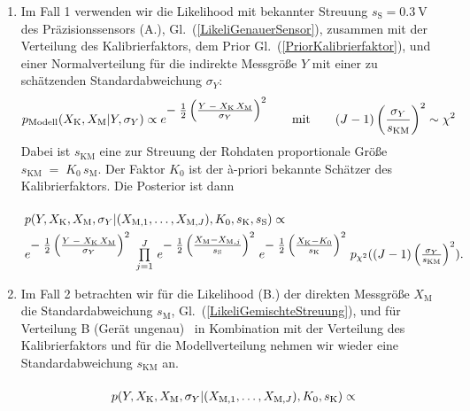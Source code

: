 \begin{enumerate}
	\item Im Fall 1 verwenden wir die Likelihood mit bekannter Streuung 
	$s_\mathrm{S} = 0.3~\mathrm{V}$ des Präzisions\-sensors (A.), Gl.~(\ref{LikeliGenauerSensor}),
	zusammen mit der Verteilung des Kalibrierfaktors, dem Prior Gl.~(\ref{PriorKalibrierfaktor}),
	und einer Normalverteilung für die indirekte Messgröße $Y$ mit einer zu
	schätzenden Standardabweichung $\sigma_Y$:
\begin{equation}
p_\mathrm{Modell} (X_\mathrm{K}, X_\mathrm{M} | Y, \sigma_Y) \propto
e^{\textstyle -\;\frac{1}{2} \left(\frac{ Y \; - \; X_\mathrm{K} \, X_\mathrm{M}}{\sigma_Y} \right)^2}
\qquad \mathrm{mit} \qquad
(J-1) \left(\frac{\sigma_Y}{s_\mathrm{KM}}\right)^2 \sim \chi^2
\label{pdfModellNormalverteilt}
\end{equation}
	Dabei ist $s_\mathrm{KM}$ eine zur Streuung der Rohdaten proportionale Größe
	$s_\mathrm{KM} \; = \; K_0 \, s_\mathrm{M}$. Der Faktor $K_0$ ist der {\`a}-priori
	bekannte Schätzer des Kalibrierfaktors.
	Die Posterior ist dann
\begin{equation}
\arraycolsep=2.0pt\def\arraystretch{2.0}
\begin{array}{l}
p(Y, X_\mathrm{K}, X_\mathrm{M}, \sigma_Y | (X_{\mathrm{M},1}, \dots, X_{\mathrm{M},J}), K_0, s_\mathrm{K}, s_\mathrm{S}) \propto \\
e^{\T-\;\frac{1}{2} \left(\frac{ Y \; - \; X_\mathrm{K} \, X_\mathrm{M}}{\sigma_Y} \right)^2}
\; \prod\limits_{j=1}^J \,
e^{\T -\;\frac{1}{2} \left(\frac{ X_\mathrm{M} - X_{\mathrm{M},j} }{s_\mathrm{S}} \right)^2}
\;  e^{\T-\;\frac{1}{2} \left(\frac{X_\mathrm{K} - K_0}{s_\mathrm{K}} \right)^2}
\; p_{\chi^2} ((J-1) \left(\frac{\sigma_Y}{s_\mathrm{KM}}\right)^2) .
\end{array}
\label{PosteriorFall1}
\end{equation}
	\item Im Fall 2 betrachten wir für die Likelihood (B.) der direkten Messgröße $X_\mathrm{M}$
	die Standardabweichung $s_\mathrm{M}$, Gl.~(\ref{LikeliGemischteStreuung}), und für 
	Verteilung B (\glqq Gerät ungenau\grqq) ~in Kombination mit der Verteilung des
	Kalibrierfaktors und für die
	Modellverteilung nehmen wir wieder eine Standardabweichung $s_\mathrm{KM}$ 
	an.
\begin{equation}
\arraycolsep=2.0pt\def\arraystretch{2.0}
\begin{array}{l}
p(Y, X_\mathrm{K}, X_\mathrm{M}, \sigma_Y | (X_{\mathrm{M},1}, \dots, X_{\mathrm{M},J}), K_0, s_\mathrm{K}) \propto \\

\end{array}
\end{equation}
\end{enumerate}
